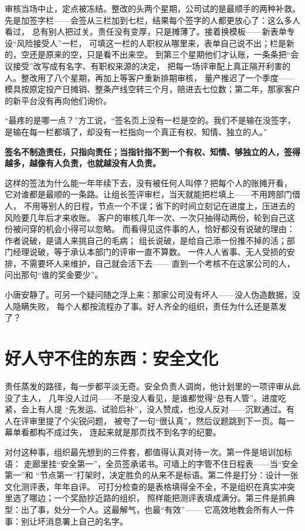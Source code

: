 审核当场中止，定点被冻结。整改的头两个星期，公司试的是最顺手的两种补救。
先是加签字栏——会签从三栏加到七栏，结果每个签字的人都更放心了：这么多人看过，
总有别人把过关。责任没有变厚，只是摊薄了。接着换模板——新表单专设“风险接受人”一栏，
可填这一栏的人职权从哪里来，表单自己说不出；栏是新的，空还是原来的空，只是看不出来空。
到第三个星期他们才认账，一条条把“会议接受”改写成有名字、有职权来源的决定，
把每一场评审配上真正隔开利害的人。整改用了八个星期，再加上等客户重新排期审核，
量产推迟了一个季度——模具按原定投产日摊销、整条产线空转三个月，赔进去七位数；第二年，那家客户的新平台没有再向他们询价。

“最疼的是哪一点？”方工说，“签名页上没有一栏是空的。我们不是输在没签字，
是输在每一栏都填了，却没有一栏指向一个真正有权、知情、独立的人。”

\textbf{签名不制造责任，只指向责任；当指针指不到一个有权、知情、够独立的人，签得越多，越像有人负责，也就越没有人负责。}

这样的签法为什么能一年年续下去，没有被任何人叫停？把每个人的账摊开看，
它对谁都是最顺的一条路。让组长签评审栏，当天就能把栏填上——不用跨部门借人，
不用等别人的日程，节点一个不误；省下的时间立刻记在进度上，压进去的风险要几年后才来收账。
客户的审核几年一次、一次只抽得动两份，轮到自己这份被问穿的机会小得可以忽略。
而看得见这件事的人，恰好都没有说破的理由：作者说破，是请人来挑自己的毛病；
组长说破，是给自己添一份推不掉的活；部门经理说破，等于承认本部门的评审一直不算数。
一件人人省事、无人受损的安排，不需要坏人来维护，自己就会活下去——
直到一个考核不在这家公司的人，问出那句“谁的奖金要少”。

小唐安静了。可另一个疑问随之浮上来：那家公司没有坏人——没人伪造数据，没人隐瞒失败，
每个人都按流程办了事。好人齐全的组织，责任为什么还是蒸发了？

\section{好人守不住的东西：安全文化}

责任蒸发的路径，每一步都平淡无奇。安全负责人调岗，他计划里的一项评审从此没了主人，
几年没人过问——不是没人看见，是谁都觉得“总有人管”。进度吃紧，会上有人提
“先发运、试验后补”，没人赞成，也没人反对——沉默通过。有人在评审里提了个尖锐问题，
被夸了一句“很认真”，然后议题跳到下一页。每一幕单看都构不成过失，
连起来就是那页找不到名字的纪要。

对付这种事，组织最先想到的三件套，都值得认真对待一次。第一件是培训加标语：
走廊里挂“安全第一”，全员签承诺书。可墙上的字管不住日程表——当“安全第一”和
“节点第一”打架时，决定胜负的从来不是标语。第二件是打分：设计一张文化测评表，年年自评。
可打分检查的是表格填得全不全，不是组织在真实冲突里选了哪边；一个奖励抄近路的组织，
照样能把测评表填成满分。第三件是抓典型：出了事，处分一个人。这最解气，也最“有效”——
它高效地教会所有人一件事：别让坏消息署上自己的名字。

